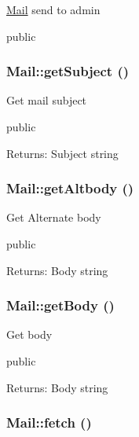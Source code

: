 \hyperlink{classMail}{Mail} send to admin

public \hypertarget{classMail_e589342450d2ef29194a98d78aa8aa21}{
\subsubsection[getSubject]{\setlength{\rightskip}{0pt plus 5cm}Mail::getSubject ()}}
\label{classMail_e589342450d2ef29194a98d78aa8aa21}


Get mail subject

public \begin{Desc}
\item[Returns:]Subject string \end{Desc}
\hypertarget{classMail_369216eb8e8fdfbceb2f4d5285c715dc}{
\subsubsection[getAltbody]{\setlength{\rightskip}{0pt plus 5cm}Mail::getAltbody ()}}
\label{classMail_369216eb8e8fdfbceb2f4d5285c715dc}


Get Alternate body

public \begin{Desc}
\item[Returns:]Body string \end{Desc}
\hypertarget{classMail_0b2b69dcc89ad08a475e7a53911b8dbf}{
\subsubsection[getBody]{\setlength{\rightskip}{0pt plus 5cm}Mail::getBody ()}}
\label{classMail_0b2b69dcc89ad08a475e7a53911b8dbf}


Get body

public \begin{Desc}
\item[Returns:]Body string \end{Desc}
\hypertarget{classMail_a8546c9659939683d8fe174190a8e374}{
\subsubsection[fetch]{\setlength{\rightskip}{0pt plus 5cm}Mail::fetch ()}}
\label{classMail_a8546c9659939683d8fe174190a8e374}


